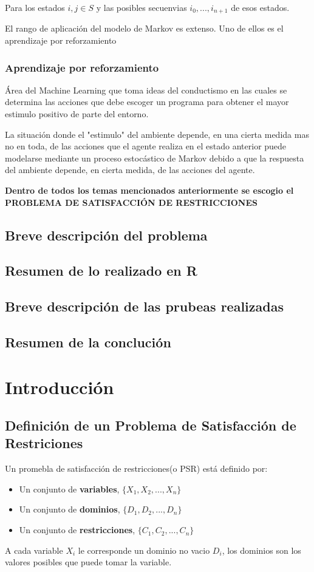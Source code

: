\documentclass[a4paper]{article}
\begin{document}
Para los estados $i,j \in S$ y las posibles secuenvias $i_{0},..., i_{n+1}$ de esos estados.

El rango de aplicación del modelo de Markov es extenso. Uno de ellos es el aprendizaje por reforzamiento

\subsubsection*{Aprendizaje por reforzamiento}
Área del Machine Learning que toma ideas del conductismo en las cuales se determina las acciones que debe escoger un programa para obtener el mayor estimulo positivo de parte del entorno.

La situación donde el "estimulo" del ambiente depende, en una cierta medida mas no en toda, de las acciones que el agente realiza en el estado anterior puede modelarse mediante un proceso estocástico de Markov debido a que la respuesta del ambiente depende, en cierta medida, de las acciones del agente.


\textbf{
Dentro de todos los temas mencionados anteriormente se escogio el PROBLEMA DE SATISFACCIÓN DE RESTRICCIONES} 
\subsection{Breve descripción del problema}

\subsection{Resumen de lo realizado en R}
\subsection{Breve descripci\'on de las prubeas realizadas}
\subsection{Resumen de la concluci\'on}



\section{Introducci\'on}
\subsection{Definición de un  Problema de Satisfacción de Restriciones}
Un promebla de satisfacción de restricciones(o PSR) está definido por:
\begin{itemize}
	\item Un conjunto de \textbf{variables}, $\{X_1, X_2,..., X_n\}$
	\item Un conjunto de \textbf{dominios}, $\{D_1, D_2,..., D_n\}$
	\item Un conjunto de \textbf{restricciones}, $\{C_1, C_2,..., C_n\}$
\end{itemize} 
A cada variable $X_i$ le corresponde un dominio no vacio $D_i$, los dominios son los valores posibles que puede tomar la variable. 
\end{document}
